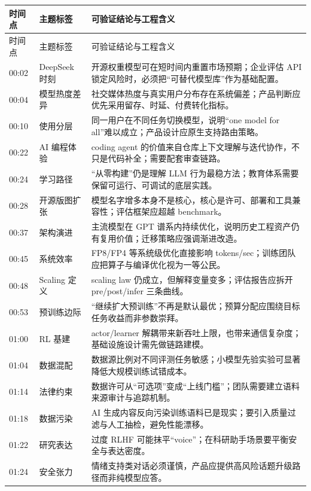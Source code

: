 \documentclass[a4paper]{article}
\begin{document}
\begin{longtable}{p{}p{}p{}}
\toprule
时间点 & 主题标签 & 可验证结论与工程含义 \\
\midrule
\endfirsthead
\toprule
时间点 & 主题标签 & 可验证结论与工程含义 \\
\midrule
\endhead
00:02 & DeepSeek 时刻 & 开源权重模型可在短时间内重置市场预期；企业评估 API 锁定风险时，必须把“可替代模型库”作为基础配置。 \\
00:04 & 模型热度差异 & 社交媒体热度与真实用户分布存在系统偏差；产品判断应优先采用留存、时延、付费转化指标。 \\
00:10 & 使用分层 & 同一用户在不同任务切换模型，说明“one model for all”难以成立；产品设计应原生支持路由策略。 \\
00:22 & AI 编程体验 & coding agent 的价值来自仓库上下文理解与迭代协作，不只是代码补全；需要配套审查链路。 \\
00:24 & 学习路径 & “从零构建”仍是理解 LLM 行为最稳方法；教育体系需要保留可运行、可调试的底层实践。 \\
00:28 & 开源版图扩张 & 模型名字增多本身不是核心，核心是许可、部署和工具兼容性；评估框架应超越 benchmark。 \\
00:37 & 架构演进 & 主流模型在 GPT 谱系内持续优化，说明历史工程资产仍有复用价值；迁移策略应强调渐进改造。 \\
00:45 & 系统效率 & FP8/FP4 等系统级优化直接影响 tokens/sec；训练团队应把算子与编译优化视为一等公民。 \\
00:48 & Scaling 定义 & scaling law 仍成立，但解释变量变多；评估报告应拆开 pre/post/infer 三条曲线。 \\
00:53 & 预训练边际 & “继续扩大预训练”不再是默认最优；预算分配应围绕目标任务收益而非参数崇拜。 \\
01:00 & RL 基建 & actor/learner 解耦带来新吞吐上限，也带来通信复杂度；基础设施设计需先做链路建模。 \\
01:04 & 数据混配 & 数据源比例对不同评测任务敏感；小模型先验实验可显著降低大规模训练试错成本。 \\
01:14 & 法律约束 & 数据许可从“可选项”变成“上线门槛”；团队需要建立语料来源审计与追踪机制。 \\
01:18 & 数据污染 & AI 生成内容反向污染训练语料已是现实；要引入质量过滤与人工抽检，避免性能漂移。 \\
01:22 & 研究表达 & 过度 RLHF 可能抹平“voice”；在科研助手场景要平衡安全与表达密度。 \\
01:24 & 安全张力 & 情绪支持类对话必须谨慎，产品应提供高风险话题升级路径而非纯模型应答。 \\

\end{longtable}
\end{document}
